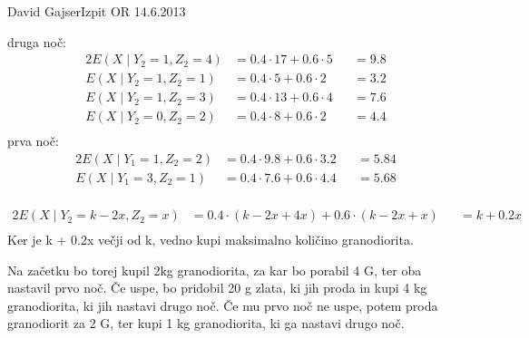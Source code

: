 \begin{naloga}{David Gajser}{Izpit OR 14.6.2013}
\begin{odgovor}
druga noč:
\begin{alignat*}{2}
E(X \mid  Y_2 = 1, Z_2 = 4) &= 0.4 \cdot 17 + 0.6 \cdot 5 &&= 9.8 \\
E(X \mid  Y_2 = 1, Z_2 = 1) &= 0.4 \cdot 5 + 0.6 \cdot 2 &&= 3.2 \\
E(X \mid  Y_2 = 1, Z_2 = 3) &= 0.4 \cdot 13 + 0.6 \cdot 4 &&= 7.6 \\
E(X \mid  Y_2 = 0, Z_2 = 2) &= 0.4 \cdot 8 + 0.6 \cdot 2 &&= 4.4 \\
\end{alignat*}
prva noč:
\begin{alignat*}{2}
E(X \mid  Y_1 = 1, Z_2 = 2) &= 0.4 \cdot 9.8 + 0.6 \cdot 3.2 &&= 5.84 \\
E(X \mid  Y_1 = 3, Z_2 = 1) &= 0.4 \cdot 7.6 + 0.6 \cdot 4.4 &&= 5.68 \\
\end{alignat*}

\begin{alignat*}{2}
E(X \mid  Y_2 = k-2x, Z_2 = x) &= 0.4 \cdot (k - 2x + 4x) + 0.6 \cdot (k - 2x + x) &&= k + 0.2x \\
\end{alignat*}
Ker je k + 0.2x večji od k, vedno kupi maksimalno količino granodiorita.

Na začetku bo torej kupil 2kg granodiorita, za kar bo porabil 4 G, ter oba nastavil prvo noč. Če uspe, bo pridobil 20 g zlata, ki 
jih proda in kupi 4 kg granodiorita, ki jih nastavi drugo noč.
Če mu prvo noč ne uspe, potem proda granodiorit za 2 G, ter kupi 1 kg granodiorita, ki ga nastavi drugo noč.

\begin{slika}
\makebox[\textwidth][c]{
\pgfslika
}
\end{slika}
\end{odgovor}
\end{naloga}
